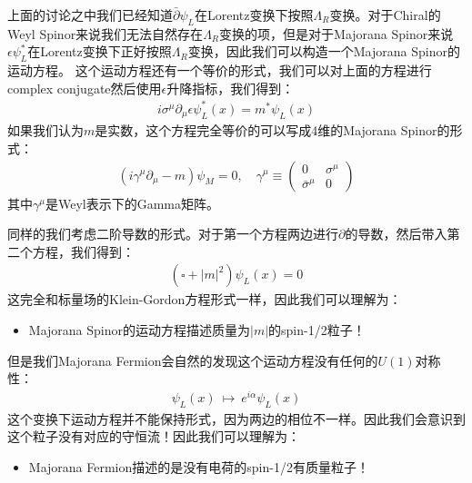 
上面的讨论之中我们已经知道$ \bar{\partial} \psi_L $在Lorentz变换下按照$ \Lambda_R
$变换。对于Chiral的Weyl Spinor来说我们无法自然存在$ \Lambda_R $变换的项，但是对于Majorana
Spinor来说$ \epsilon \psi_L^*$在Lorentz变换下正好按照$ \Lambda_R
$变换，因此我们可以构造一个Majorana Spinor的运动方程。
这个运动方程还有一个等价的形式，我们可以对上面的方程进行complex conjugate然后使用$ \epsilon $升降指标，我们得到：
\begin{align}
  i\sigma^\mu\partial_\mu\epsilon\psi_L^*(x)=m^*\psi_L(x)
\end{align}
如果我们认为$ m $是实数，这个方程完全等价的可以写成4维的Majorana Spinor的形式：
\begin{align}
  (i\gamma^\mu\partial_\mu-m)\psi_M=0 , \quad \gamma^\mu\equiv
  \begin{pmatrix}0&\sigma^\mu\\\bar{\sigma}^\mu&0
  \end{pmatrix}
\end{align}
其中$ \gamma^\mu $是Weyl表示下的Gamma矩阵。

\bigskip
{}

同样的我们考虑二阶导数的形式。对于第一个方程两边进行$ \partial $的导数，然后带入第二个方程，我们得到：
\begin{align}
  (\square+|m|^2)\psi_L(x)=0
\end{align}
这完全和标量场的Klein-Gordon方程形式一样，因此我们可以理解为：
\begin{itemize}
  \item Majorana Spinor的运动方程描述质量为$ |m| $的spin-1/2粒子！
\end{itemize}

\bigskip
{}

但是我们Majorana Fermion会自然的发现这个运动方程没有任何的$ U(1) $对称性：
\begin{align}
  \psi_L(x)\mathrm{~}\mapsto\mathrm{~}e^{i\alpha}\psi_L(x)
\end{align}
这个变换下运动方程并不能保持形式，因为两边的相位不一样。因此我们会意识到这个粒子没有对应的守恒流！因此我们可以理解为：
\begin{itemize}
  \item Majorana Fermion描述的是没有电荷的spin-1/2有质量粒子！
\end{itemize}

